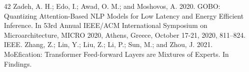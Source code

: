 \documentclass[conference]{IEEEtran}
\begin{document}
\begin{thebibliography}{42}
 Zadeh, A. H.; Edo, I.; Awad, O. M.; and Moshovos, A. 2020. GOBO: Quantizing Attention-Based NLP Models for Low Latency and Energy Efficient Inference. In 53rd Annual IEEE/ACM International Symposium on Microarchitecture, MICRO 2020, Athens, Greece, October 17-21, 2020, 811–824. IEEE.
 Zhang, Z.; Lin, Y.; Liu, Z.; Li, P.; Sun, M.; and Zhou, J. 2021. MoEfication: Transformer Feed-forward Layers are Mixtures of Experts. In Findings.
\end{thebibliography}
\end{document}
